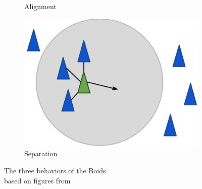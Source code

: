 \begin{figure}[h]
\begin{subfigure}[b]{0.23\textwidth}
        \caption{Alignment}
        \label{fig:boid_ali}
    \end{subfigure}
    \hfill
    \begin{subfigure}[b]{0.3\textwidth}
        \centering
        \includegraphics[width=\textwidth]{images/boid_separation}
        \caption{Separation}
        \label{fig:boid_sep}
    \end{subfigure}
    \caption[Boids behavior]{The three behaviors of the Boids \\  based on figures from \cite{1_red3d.com_2015}}
    \label{fig:boidbehavior}
\end{figure}


%

